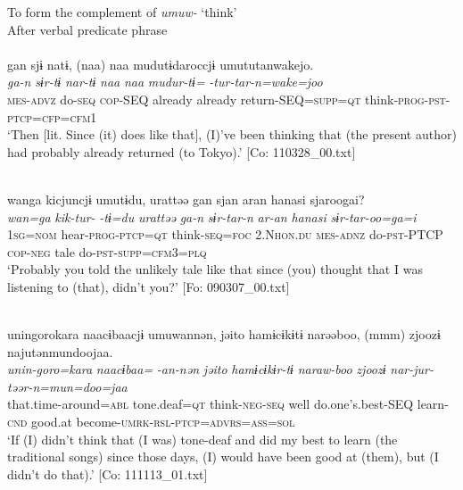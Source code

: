 \ea\label{ex:10.69}   To form the complement of \textit{umuw-} ‘think’\\
   After verbal predicate phrase\\
  \ea\relax  [= (10-52 b)]\\
      \glll    gan  sjɨ  natɨ,  (naa)  naa  mudutɨdaroccjɨ umututanwakejo.\\
      \textit{ga-n}  \textit{sɨr-tɨ}  \textit{nar-tɨ}  \textit{naa}  \textit{naa}  \textit{mudur-tɨ=} \textit{-tur-tar-n=wake=joo}\\
      \textsc{mes}-\textsc{advz}  do-\textsc{seq}  \textsc{cop}-SEQ  already  already  return-SEQ=\textsc{supp}=\textsc{qt}  think-\textsc{prog}-\textsc{pst}-\textsc{ptcp}=\textsc{cfp}=\textsc{cfm}1\\
      \glt ‘Then [lit. Since (it) does like that], (I)’ve been thinking that (the present author) had probably already returned (to Tokyo).’  [Co: 110328\_00.txt]

  \ex\relax  [= (8-41)]\\
      \glll    wanga  kicjuncjɨ  umutɨdu,  urattəə  gan  sjan  aran  hanasi  sjaroogai?\\
      \textit{wan=ga}  \textit{kik-tur-}  \textit{-tɨ=du}  \textit{urattəə}   \textit{ga-n}  \textit{sɨr-tar-n}  \textit{ar-an}  \textit{hanasi}  \textit{sɨr-tar-oo=ga=i}\\
      1\textsc{sg}=\textsc{nom}  hear-\textsc{prog}-\textsc{ptcp}=\textsc{qt}  think-\textsc{seq}=\textsc{foc}  2.N\textsc{hon}.\textsc{du}  \textsc{mes}-\textsc{adnz}  do-\textsc{pst}-PTCP  \textsc{cop}-\textsc{neg}  tale  do-\textsc{pst}-\textsc{supp}=\textsc{cfm}3=\textsc{plq}\\
      \glt       ‘Probably you told the unlikely tale like that since (you) thought that I was listening to (that), didn’t you?’ [Fo: 090307\_00.txt]

  \ex\relax [= (8-141 b)]\\
      \glll    unin{\textbar}goro{\textbar}kara  naacɨbaacjɨ  umuwannən,  jəito  hamɨcɨkɨtɨ narəəboo,  (mmm)  zjoozɨ  najutənmundoojaa.\\
      \textit{unin-goro=kara}  \textit{naacɨbaa=}  \textit{-an-nən}  \textit{jəito}  \textit{hamɨcɨkɨr-tɨ}   \textit{naraw-boo} {}   \textit{zjoozɨ}  \textit{nar-jur-təər-n=mun=doo=jaa}\\
      that.time-around=\textsc{abl}  tone.deaf=\textsc{qt}  think-\textsc{neg}-\textsc{seq}  well  do.one’s.best-SEQ  learn-\textsc{cnd}  {}  good.at  become-\textsc{umrk}-\textsc{rsl}-\textsc{ptcp}=\textsc{advrs}=\textsc{ass}=\textsc{sol}\\
      \glt       ‘If (I) didn’t think that (I was) tone-deaf and did my best to learn (the traditional songs) since those days, (I) would have been good at (them), but (I didn’t do that).’ [Co: 111113\_01.txt]
    \z
\z

